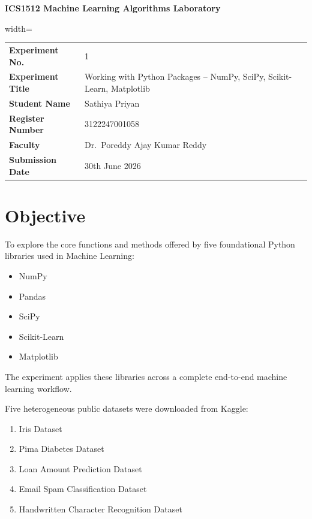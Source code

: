 \documentclass[12pt,a4paper]{article}
\begin{document}
\begin{center}

{\Large\textbf{ICS1512 Machine Learning Algorithms Laboratory}}

\vspace{1cm}
\begin{adjustbox}{width=\textwidth}
\begin{tabular}{ll}
\textbf{Experiment No.} & 1\\[0.3cm]

\textbf{Experiment Title} &
Working with Python Packages -- NumPy, SciPy, Scikit-Learn, Matplotlib\\[0.3cm]

\textbf{Student Name} & Sathiya Priyan\\[0.3cm]

\textbf{Register Number} & 3122247001058\\[0.3cm]

\textbf{Faculty} & Dr.\ Poreddy Ajay Kumar Reddy\\[0.3cm]

\textbf{Submission Date} & 30th June 2026

\end{tabular}
\end{adjustbox}
\end{center}

\vspace{1cm}

\section{Objective}

To explore the core functions and methods offered by five foundational Python
libraries used in Machine Learning:

\begin{itemize}
    \item NumPy
    \item Pandas
    \item SciPy
    \item Scikit-Learn
    \item Matplotlib
\end{itemize}

The experiment applies these libraries across a complete end-to-end machine
learning workflow.

Five heterogeneous public datasets were downloaded from Kaggle:

\begin{enumerate}
    \item Iris Dataset
    \item Pima Diabetes Dataset
    \item Loan Amount Prediction Dataset
    \item Email Spam Classification Dataset
    \item Handwritten Character Recognition Dataset
\end{enumerate}
\end{document}
